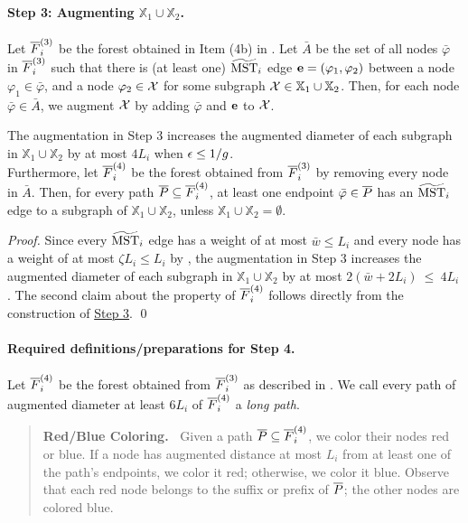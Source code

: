 \paragraph{Step 3: Augmenting $\mathbb{X}_1\cup \mathbb{X}_2$.~}\hypertarget{S3T2}{}   Let $\overline{F}^{(3)}_i$ be the forest obtained in Item (4b) in . Let $\bar{A}$ be the set of all nodes $\bar{\varphi}$ in $\overline{F}^{(3)}_i$ such that there is (at least one)  $\widetilde{\mathrm{MST}}_i$ edge $\mathbf{e} = (\varphi_1,\varphi_2)$ between a node $\varphi_1 \in \bar{\varphi}$, and a node $\varphi_2 \in \mathcal{X}$ for some subgraph $\mathcal{X} \in\mathbb{X}_1\cup \mathbb{X}_2$. Then, for each node  $\bar{\varphi}\in \bar{A}$, we augment $\mathcal{X}$ by adding $\bar{\varphi}$ and $\mathbf{e}$ to $\mathcal{X}$.


\begin{lemma}\label{lm:Clustering-Step3} The augmentation in Step 3 increases the augmented diameter of each subgraph in  $\mathbb{X}_1\cup \mathbb{X}_2$ by at most $4L_i$ when $\epsilon \leq 1/g$. \\
	Furthermore, let $\overline{F}^{(4)}_i$ be the forest obtained from $\overline{F}^{(3)}_i$ by removing every node in $\bar{A}$. Then, for every path $\overline{P} \subseteq \overline{F}^{(4)}_i$,  at least one endpoint $\bar{\varphi} \in \overline{P}$ has an $\widetilde{\mathrm{MST}}_{i}$ edge to a subgraph of $\mathbb{X}_1\cup \mathbb{X}_2$, unless $\mathbb{X}_1\cup \mathbb{X}_2 = \emptyset$. 
\end{lemma}
\begin{proof}
	Since every $\widetilde{\mathrm{MST}}_{i}$ edge has a weight of at most $\bar{w}\leq L_i$ and every node has a weight of at most $\zeta L_i \leq L_i$ by , the augmentation in Step 3 increases the augmented diameter of each subgraph in  $\mathbb{X}_1\cup \mathbb{X}_2$ by at most $2(\bar{w} + 2L_i) ~\leq~ 4L_i$. The second claim about the property of  $\overline{F}^{(4)}_i$ follows directly from the construction of \hyperlink{S3T2}{Step 3}.  \qed
\end{proof}

\paragraph{Required definitions/preparations for Step 4.~} Let $\overline{F}^{(4)}_i$ be the forest obtained from $\overline{F}^{(3)}_i$ as described in . We call every path of augmented diameter at least $6L_i$ of $\overline{F}^{(4)}_i$ a \emph{long path}. 


\begin{quote}
	\textbf{Red/Blue Coloring.~}\hypertarget{RBColoring}{}  Given a path $\overline{P}\subseteq \overline{F}^{(4)}_i$, we color their nodes red or blue. If a node has augmented distance at most $L_i$ from at least one of the path's endpoints, we color it red; otherwise, we color it blue. Observe that each red node belongs to the suffix or prefix of $\overline{P}$; the other nodes are colored blue. 
\end{quote}

